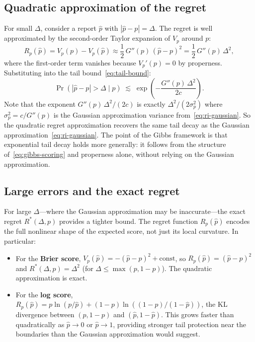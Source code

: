 \documentclass[11pt]{article}
\begin{document}
\subsection{Quadratic approximation of the regret}

For small $\Delta$, consider a report $\hat{p}$ with $|\hat{p} - p| = \Delta$. The regret is well approximated by the second-order Taylor expansion of $V_p$ around $p$:
\begin{equation}\label{eq:regret-quadratic}
R_p(\hat{p}) = V_p(p) - V_p(\hat{p}) \approx \frac{1}{2}\,G''(p)\,(\hat{p}-p)^2 = \frac{1}{2}\,G''(p)\,\Delta^2,
\end{equation}
where the first-order term vanishes because $V_p'(p) = 0$ by properness.
Substituting into the tail bound~\eqref{eq:tail-bound}:
\begin{equation}\label{eq:tail-gaussian-recovery}
\Pr(|\hat{p} - p| > \Delta \mid p) \;\lesssim\; \exp\!\left(-\frac{G''(p)\,\Delta^2}{2c}\right).
\end{equation}
Note that the exponent $G''(p)\,\Delta^2/(2c)$ is exactly $\Delta^2/(2\sigma^2_p)$ where $\sigma^2_p = c/G''(p)$ is the Gaussian approximation variance from~\eqref{eq:ri-gaussian}. So the quadratic regret approximation recovers the same tail decay as the Gaussian approximation~\eqref{eq:ri-gaussian}. The point of the Gibbs framework is that exponential tail decay holds more generally: it follows from the structure of~\eqref{eq:gibbs-scoring} and properness alone, without relying on the Gaussian approximation.

\subsection{Large errors and the exact regret}

For large $\Delta$---where the Gaussian approximation may be inaccurate---the exact regret $R^*(\Delta,p)$ provides a tighter bound. The regret function $R_p(\hat{p})$ encodes the full nonlinear shape of the expected score, not just its local curvature. In particular:

\begin{itemize}
\item For the \textbf{Brier score}, $V_p(\hat{p}) = -(\hat{p}-p)^2 + \text{const}$, so $R_p(\hat{p}) = (\hat{p}-p)^2$ and $R^*(\Delta,p) = \Delta^2$ (for $\Delta \leq \max(p,1-p)$). The quadratic approximation is exact.

\item For the \textbf{log score}, $R_p(\hat{p}) = p\ln(p/\hat{p}) + (1-p)\ln((1-p)/(1-\hat{p}))$, the KL divergence between $(p,1-p)$ and $(\hat{p},1-\hat{p})$. This grows faster than quadratically as $\hat{p} \to 0$ or $\hat{p} \to 1$, providing stronger tail protection near the boundaries than the Gaussian approximation would suggest.
\end{itemize}
\end{document}
